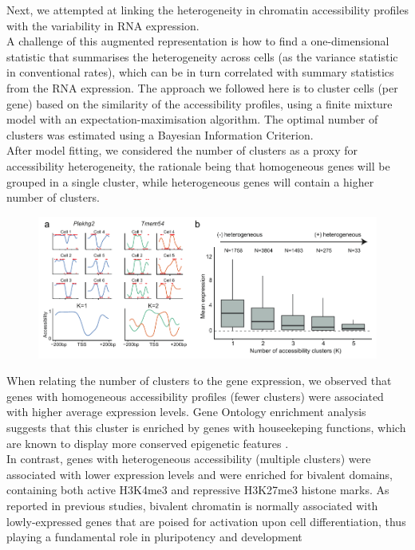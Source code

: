 Next, we attempted at linking the heterogeneity in chromatin accessibility profiles with the variability in RNA expression.\\
A challenge of this augmented representation is how to find a one-dimensional statistic that summarises the heterogeneity across cells (as the variance statistic in conventional rates), which can be in turn correlated with summary statistics from the RNA expression. The approach we followed here is to cluster cells (per gene) based on the similarity of the accessibility profiles, using a finite mixture model with an expectation-maximisation algorithm. The optimal number of clusters was estimated using a Bayesian Information Criterion.\\
After model fitting, we considered the number of clusters as a proxy for accessibility heterogeneity, the rationale being that homogeneous genes will be grouped in a single cluster, while heterogeneous genes will contain a higher number of clusters.\\

\begin{figure}[H]
	\centering
	\includegraphics[width=0.9\linewidth]{scNMT_profiles_clusters}
	\caption[]{}
	\label{fig:scnmt_profiles_clusters}
\end{figure}

When relating the number of clusters to the gene expression, we observed that genes with homogeneous accessibility profiles (fewer clusters) were associated with higher average expression levels. Gene Ontology enrichment analysis suggests that this cluster is enriched by genes with houseekeping functions, which are known to display more conserved epigenetic features \cite{She2009}.\\
In contrast, genes with heterogeneous accessibility (multiple clusters) were associated with lower expression levels and were enriched for bivalent domains, containing both active H3K4me3 and repressive H3K27me3 histone marks. As reported in previous studies, bivalent chromatin is normally associated with lowly-expressed genes that are poised for activation upon cell differentiation, thus playing a fundamental role in pluripotency and development \cite{Vastenhouw2012,Bernstein2006}

